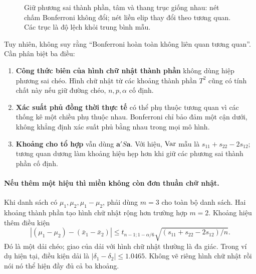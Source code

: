\begin{figure}[htbp]
\centering
{}
\caption{Giữ phương sai thành phần, tâm và thang trục giống nhau:
 nét chấm Bonferroni không đổi; nét liền elip thay đổi theo tương quan.
 Các trục là độ lệch khỏi trung bình mẫu.}
\label{fig:rho_regions}
\end{figure}


Tuy nhiên, không suy rằng ``Bonferroni hoàn toàn không liên quan tương
quan''. Cần phân biệt ba điều:
\begin{enumerate}
 \item \textbf{Công thức biên của hình chữ nhật thành phần} không dùng
 hiệp phương sai chéo. Hình chữ nhật từ các khoảng thành phần $T^2$
 cũng có tính chất này nếu giữ đường chéo, $n,p,\alpha$ cố định.
 \item \textbf{Xác suất phủ đồng thời thực tế} có thể phụ thuộc tương
 quan vì các thống kê một chiều phụ thuộc nhau. Bonferroni chỉ bảo đảm
 một cận dưới, không khẳng định xác suất phủ bằng nhau trong mọi mô hình.
 \item \textbf{Khoảng cho tổ hợp} vẫn dùng $\mathbf a'S\mathbf a$.
 Với hiệu, $\operatorname{Var}$ mẫu là $s_{11}+s_{22}-2s_{12}$; tương quan dương
 làm khoảng hiệu hẹp hơn khi giữ các phương sai thành phần cố định.
\end{enumerate}

\paragraph{Nếu thêm một hiệu thì miền không còn đơn thuần chữ nhật.}
Khi danh sách có $\mu_1,\mu_2,\mu_1-\mu_2$, phải dùng $m=3$ cho
toàn bộ danh sách. Hai khoảng thành phần tạo hình chữ nhật rộng hơn
trường hợp $m=2$. Khoảng hiệu thêm điều kiện
\[
 |(\mu_1-\mu_2)-(\bar x_1-\bar x_2)|
 \le t_{n-1;1-\alpha/6}\sqrt{(s_{11}+s_{22}-2s_{12})/n}.
\]
Đó là một dải chéo; giao của dải với hình chữ nhật thường là đa giác.
Trong ví dụ hiện tại, điều kiện dải là $|\delta_1-\delta_2|\le1.0465$.
Không vẽ riêng hình chữ nhật rồi nói nó thể hiện đầy đủ cả ba khoảng.

